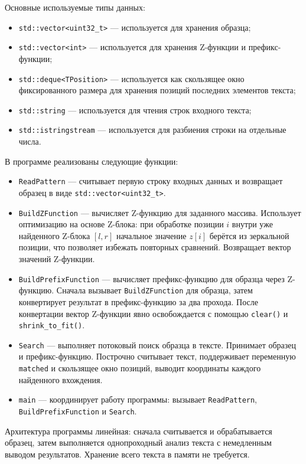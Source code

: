 \documentclass[12pt]{article}
\begin{document}
Основные используемые типы данных:
\begin{itemize}
	\item \texttt{std::vector<uint32\_t>} — используется для хранения образца;
	\item \texttt{std::vector<int>} — используется для хранения Z-функции и префикс-функции;
	\item \texttt{std::deque<TPosition>} — используется как скользящее окно фиксированного размера для хранения позиций последних элементов текста;
	\item \texttt{std::string} — используется для чтения строк входного текста;
	\item \texttt{std::istringstream} — используется для разбиения строки на отдельные числа.
\end{itemize}

В программе реализованы следующие функции:
\begin{itemize}
	\item \texttt{ReadPattern} — считывает первую строку входных данных и возвращает образец в виде \texttt{std::vector<uint32\_t>}.
	\item \texttt{BuildZFunction} — вычисляет Z-функцию для заданного массива. Использует оптимизацию на основе Z-блока: при обработке позиции $i$ внутри уже найденного Z-блока $[l, r]$ начальное значение $z[i]$ берётся из зеркальной позиции, что позволяет избежать повторных сравнений. Возвращает вектор значений Z-функции.
	\item \texttt{BuildPrefixFunction} — вычисляет префикс-функцию для образца через Z-функцию. Сначала вызывает \texttt{BuildZFunction} для образца, затем конвертирует результат в префикс-функцию за два прохода. После конвертации вектор Z-функции явно освобождается с помощью \texttt{clear()} и \texttt{shrink\_to\_fit()}.
	\item \texttt{Search} — выполняет потоковый поиск образца в тексте. Принимает образец и префикс-функцию. Построчно считывает текст, поддерживает переменную \texttt{matched} и скользящее окно позиций, выводит координаты каждого найденного вхождения.
	\item \texttt{main} — координирует работу программы: вызывает \texttt{ReadPattern}, \texttt{BuildPrefixFunction} и \texttt{Search}.
\end{itemize}

Архитектура программы линейная: сначала считывается и обрабатывается образец, затем выполняется однопроходный анализ текста с немедленным выводом результатов. Хранение всего текста в памяти не требуется.
\end{document}
